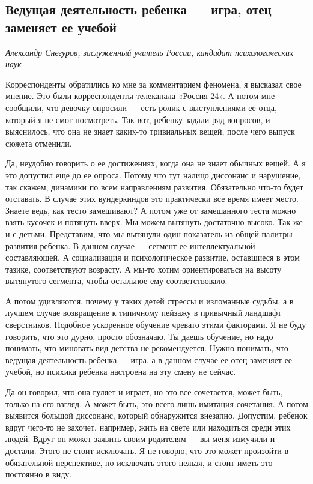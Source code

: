 \subsection{Ведущая деятельность ребенка --- игра, отец заменяет ее учебой}
\textit{Александр Снегуров, заслуженный учитель России, кандидат психологических наук}

Корреспонденты обратились ко мне за комментарием феномена, я высказал свое мнение. Это были корреспонденты телеканала «Россия 24». А потом мне сообщили, что девочку опросили --- есть ролик с выступлениями ее отца, который я не смог посмотреть. Так вот, ребенку задали ряд вопросов, и выяснилось, что она не знает каких-то тривиальных вещей, после чего выпуск сюжета отменили.

Да, неудобно говорить о ее достижениях, когда она не знает обычных вещей. А я это допустил еще до ее опроса. Потому что тут налицо диссонанс и нарушение, так скажем, динамики по всем направлениям развития. Обязательно что-то будет отставать. В случае этих вундеркиндов это практически все время имеет место. Знаете ведь, как тесто замешивают? А потом уже от замешанного теста можно взять кусочек и потянуть вверх. Мы можем вытянуть достаточно высоко. Так же и с детьми. Представим, что мы вытянули один показатель из общей палитры развития ребенка. В данном случае --- сегмент ее интеллектуальной составляющей. А социализация и психологическое развитие, оставшиеся в этом тазике, соответствуют возрасту. А мы-то хотим ориентироваться на высоту вытянутого сегмента, чтобы остальное ему соответствовало.

А потом удивляются, почему у таких детей стрессы и изломанные судьбы, а в лучшем случае возвращение к типичному пейзажу в привычный ландшафт сверстников. Подобное ускоренное обучение чревато этими факторами. Я не буду говорить, что это дурно, просто обозначаю. Ты даешь обучение, но надо понимать, что миновать вид детства не рекомендуется. Нужно понимать, что ведущая деятельность ребенка --- игра, а в данном случае ее отец заменяет ее учебой, но психика ребенка настроена на эту смену не сейчас.

Да он говорил, что она гуляет и играет, но это все сочетается, может быть, только на его взгляд. А может быть, это всего лишь имитация сочетания. А потом выявится большой диссонанс, который обнаружится внезапно. Допустим, ребенок вдруг чего-то не захочет, например, жить на свете или находиться среди этих людей. Вдруг он может заявить своим родителям --- вы меня измучили и достали. Этого не стоит исключать. Я не говорю, что это может произойти в обязательной перспективе, но исключать этого нельзя, и стоит иметь это постоянно в виду.


